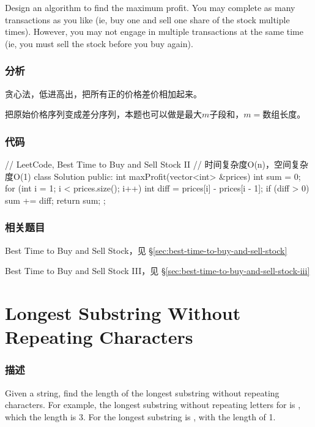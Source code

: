 Design an algorithm to find the maximum profit. You may complete as many transactions as you like (ie, buy one and sell one share of the stock multiple times). However, you may not engage in multiple transactions at the same time (ie, you must sell the stock before you buy again).


\subsubsection{分析}
贪心法，低进高出，把所有正的价格差价相加起来。

把原始价格序列变成差分序列，本题也可以做是最大$m$子段和，$m=$数组长度。

\subsubsection{代码}
\begin{Code}
// LeetCode, Best Time to Buy and Sell Stock II
// 时间复杂度O(n)，空间复杂度O(1)
class Solution {
public:
    int maxProfit(vector<int> &prices) {
        int sum = 0;
        for (int i = 1; i < prices.size(); i++) {
            int diff = prices[i] - prices[i - 1];
            if (diff > 0) sum += diff;
        }
        return sum;
    }
};
\end{Code}


\subsubsection{相关题目}
\begindot
\item Best Time to Buy and Sell Stock，见 \S \ref{sec:best-time-to-buy-and-sell-stock}
\item Best Time to Buy and Sell Stock III，见 \S \ref{sec:best-time-to-buy-and-sell-stock-iii}
\myenddot


\section{Longest Substring Without Repeating Characters} %
\label{sec:longest-substring-without-repeating-characters}


\subsubsection{描述}
Given a string, find the length of the longest substring without repeating characters. For example, the longest substring without repeating letters for  is , which the length is 3. For  the longest substring is , with the length of 1.


